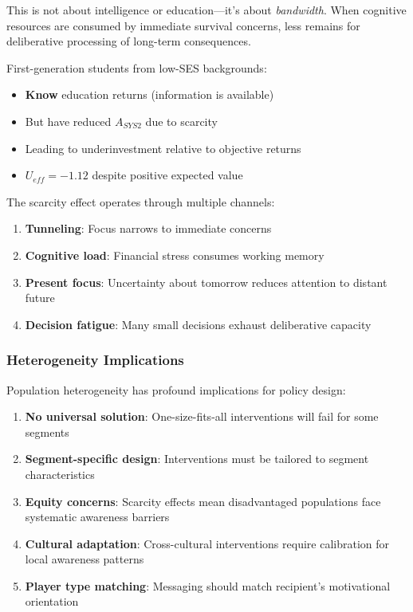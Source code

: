This is not about intelligence or education—it's about \emph{bandwidth}. 
When cognitive resources are consumed by immediate survival concerns, 
less remains for deliberative processing of long-term consequences.

\begin{example}
First-generation students from low-SES backgrounds:
\begin{itemize}
    \item \textbf{Know} education returns (information is available)
    \item But have reduced $A_{SYS2}$ due to scarcity
    \item Leading to underinvestment relative to objective returns
    \item $U_{eff} = -1.12$ despite positive expected value
\end{itemize}
\end{example}

The scarcity effect operates through multiple channels:
\begin{enumerate}
    \item \textbf{Tunneling}: Focus narrows to immediate concerns
    \item \textbf{Cognitive load}: Financial stress consumes working memory
    \item \textbf{Present focus}: Uncertainty about tomorrow reduces 
          attention to distant future
    \item \textbf{Decision fatigue}: Many small decisions exhaust 
          deliberative capacity
\end{enumerate}

\subsubsection{Heterogeneity Implications}

Population heterogeneity has profound implications for policy design:

\begin{enumerate}
    \item \textbf{No universal solution}: One-size-fits-all interventions 
          will fail for some segments
    \item \textbf{Segment-specific design}: Interventions must be 
          tailored to segment characteristics
    \item \textbf{Equity concerns}: Scarcity effects mean disadvantaged 
          populations face systematic awareness barriers
    \item \textbf{Cultural adaptation}: Cross-cultural interventions 
          require calibration for local awareness patterns
    \item \textbf{Player type matching}: Messaging should match 
          recipient's motivational orientation
\end{enumerate}

